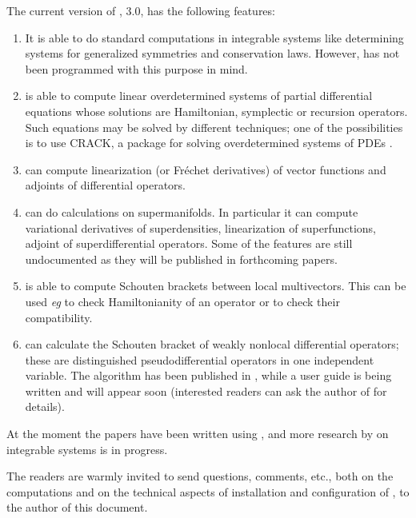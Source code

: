 The current version of \cde, 3.0, has the following features:
\begin{enumerate}
\item It is able to do standard computations in integrable systems like
  determining systems for generalized symmetries and conservation
  laws. However, \cde has not been programmed with this purpose in mind.
\item \cde is able to compute linear overdetermined systems of partial
  differential equations whose solutions are Hamiltonian, symplectic or
  recursion operators. Such equations may be solved by different techniques;
  one of the possibilities is to use CRACK, a \REDUCE package for solving
  overdetermined systems of PDEs \cite{WolfBrand:CRACK}.
\item \cde can compute linearization (or Fr\'echet derivatives) of vector
  functions and adjoints of differential operators.
\item \cde can do calculations on supermanifolds. In particular it can compute
  variational derivatives of superdensities, linearization of superfunctions,
  adjoint of superdifferential operators. Some of the features are still
  undocumented as they will be published in forthcoming papers.
\item \cde is able to compute Schouten brackets between local
  multivectors. This can be used \emph{eg} to check Hamiltonianity of an
  operator or to check their compatibility.
\item \cde can calculate the Schouten bracket of weakly nonlocal differential
  operators; these are distinguished pseudodifferential operators in one
  independent variable. The algorithm has been published in \cite{CLV2020},
  while a user guide is being written and will appear soon (interested readers
  can ask the author of \cde for details).
\end{enumerate}

At the moment the papers
\cite{Ferapontov:2014,Ferapontov:2016,KerstenKrasilshchikVerbovetskyVitolo:HSGP,KrasilshchikVerbovetskyVitolo:SPT:2012,PavlovVitolo:2015,SaccomandiVitolo:2014}
have been written using \cde, and more research by \cde on integrable systems
is in progress.

The readers are warmly invited to send questions, comments, etc., both on the
computations and on the technical aspects of installation and configuration of
\REDUCE, to the author of this document.

